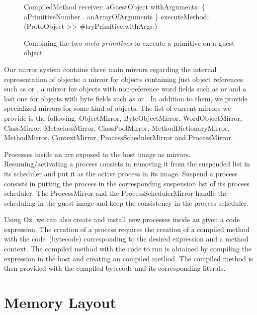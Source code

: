 \begin{figure}[htb]
\begin{code}
CompiledMethod
       receiver: aGuestObject
       withArguments: \{ aPrimitiveNumber . anArrayOfArguments \}
       executeMethod: (ProtoObject >> #tryPrimitive:withArgs:)
\end{code}
\caption{Combining the two \emph{meta primitives} to execute a primitive on a guest object\label{code:meta_primitives}}
\end{figure}

Our mirror system contains three main mirrors regarding the internal representation of objects: a mirror for objects containing just object references such as  or , a mirror for objects with non-reference word fields such as  or  and a last one for objects with byte fields such as  or . In addition to them, we provide specialized mirrors for some kind of objects. The list of current mirrors we provide is the following: ObjectMirror, ByteObjectMirror, WordObjectMirror, ClassMirror, MetaclassMirror, ClassPoolMirror, MethodDictionaryMirror, MethodMirror, ContextMirror, ProcessSchedulerMirror and ProcessMirror.

Processes inside an \objectspace are exposed to the host image as mirrors. Resuming/activating a process consists in removing it from the suspended list in its scheduler and put it as the active process in its image. Suspend a process consists in putting the process in the corresponding suspension list of its process scheduler. The ProcessMirror and the ProcessSchedulerMirror handle the scheduling in the guest image and keep the consistency in the \objectspace process scheduler.

Using Oz, we can also create and install new processes inside an \objectspace given a code expression. The creation of a process requires the creation of a compiled method with the code~(bytecode) corresponding to the desired expression and a method context. The compiled method with the code to run is obtained by compiling the expression in the host and creating an \objectspace compiled method. The \objectspace compiled method is then provided with the compiled bytecode and its corresponding literals.

\section{Memory Layout} \label{sec:memory}


